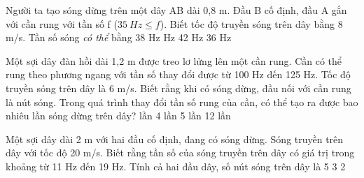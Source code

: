\begin{vidu}%
Người ta tạo sóng dừng trên một dây AB dài 0,8 m. Đầu B cố định, đầu A gắn với cần rung với tần số f  ($35 \ Hz \leq f$). Biết tốc độ truyền sóng trên dây bằng 8 m/s. Tần số sóng \textit{có thể} bằng
\choice
{38 Hz}
{ Hz}
{42 Hz}
{36 Hz}
\end{vidu} 
\begin{vidu}%
Một sợi dây đàn hồi dài 1,2 m được treo lơ lửng lên một cần rung. Cần có thể rung theo phương ngang với tần số thay đổi được từ 100 Hz đến 125 Hz. Tốc độ truyền sóng trên dây là 6 m/s. Biết rằng khi có sóng dừng, đầu nối với cần rung là nút sóng. Trong quá trình thay đổi tần số rung của cần, có thể tạo ra được bao nhiêu lần sóng dừng trên dây? 
\choice
{ lần}
{4 lần}
{5 lần}
{12 lần}
\end{vidu} 
\begin{vidu}%
 Một sợi dây dài 2 m với hai đầu cố định, đang có sóng dừng. Sóng truyền trên dây với tốc độ 20 m/s. Biết rằng tần số của sóng truyền trên dây có giá trị trong khoảng từ 11 Hz đến 19 Hz. Tính cả hai đầu dây, số nút sóng trên dây là
\choice
{5}
{3}
{}
{2}
\end{vidu} 

